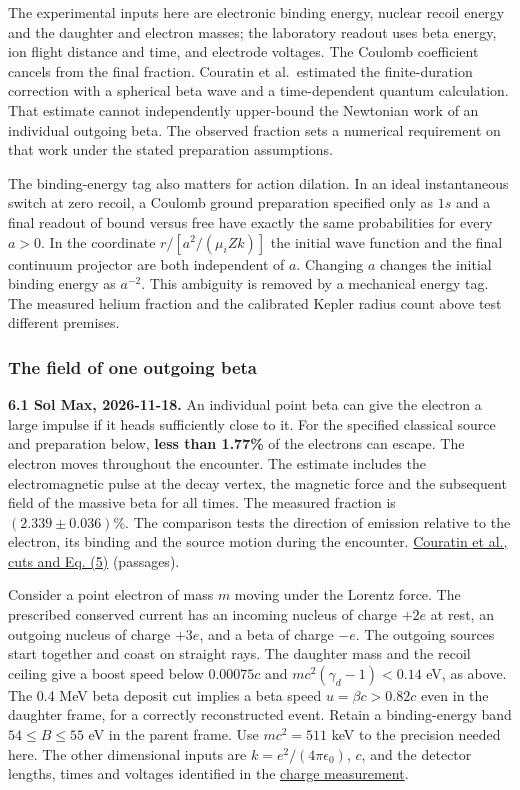 \documentclass[11pt,a4paper]{article}
\begin{document}
The experimental inputs here are electronic binding energy, nuclear
recoil energy and the daughter and electron masses; the laboratory
readout uses beta energy, ion flight distance and time, and electrode
voltages. The Coulomb coefficient cancels from the final fraction.
Couratin et al.~estimated the finite-duration correction with a
spherical beta wave and a time-dependent quantum calculation. That
estimate cannot independently upper-bound the Newtonian work of an
individual outgoing beta. The observed fraction sets a numerical
requirement on that work under the stated preparation assumptions.

The binding-energy tag also matters for action dilation. In an ideal
instantaneous switch at zero recoil, a Coulomb ground preparation
specified only as \(1s\) and a final readout of bound versus free have
exactly the same probabilities for every \(a>0\). In the coordinate
\(r/[a^2/(\mu_i Zk)]\) the initial wave function and the final continuum
projector are both independent of \(a\). Changing \(a\) changes the
initial binding energy as \(a^{-2}\). This ambiguity is removed by a
mechanical energy tag. The measured helium fraction and the calibrated
Kepler radius count above test different premises.

\subsubsection{The field of one outgoing
beta}\label{the-field-of-one-outgoing-beta}

\textbf{6.1 Sol Max, 2026-11-18.} An individual point beta can give the
electron a large impulse if it heads sufficiently close to it. For the
specified classical source and preparation below, \textbf{less than
1.77\%} of the electrons can escape. The electron moves throughout the
encounter. The estimate includes the electromagnetic pulse at the decay
vertex, the magnetic force and the subsequent field of the massive beta
for all times. The measured fraction is \((2.339\pm0.036)\%\). The
comparison tests the direction of emission relative to the electron, its
binding and the source motion during the encounter.
\href{https://in2p3.hal.science/in2p3-00709325v1/document\#page=3}{Couratin
et al., cuts and Eq. (5)} (passages).

Consider a point electron of mass \(m\) moving under the Lorentz force.
The prescribed conserved current has an incoming nucleus of charge
\(+2e\) at rest, an outgoing nucleus of charge \(+3e\), and a beta of
charge \(-e\). The outgoing sources start together and coast on straight
rays. The daughter mass and the recoil ceiling give a boost speed below
\(0.00075c\) and \(mc^2(\gamma_d-1)<0.14\) eV, as above. The 0.4 MeV
beta deposit cut implies a beta speed \(u=\beta c>0.82c\) even in the
daughter frame, for a correctly reconstructed event. Retain a
binding-energy band \(54\le B\le55\) eV in the parent frame. Use
\(mc^2=511\) keV to the precision needed here. The other dimensional
inputs are \(k=e^2/(4\pi\epsilon_0)\), \(c\), and the detector lengths,
times and voltages identified in the
\href{../docs/CouratinEtAl_Helium6_ChargeReadout.md}{charge
measurement}.
\end{document}
